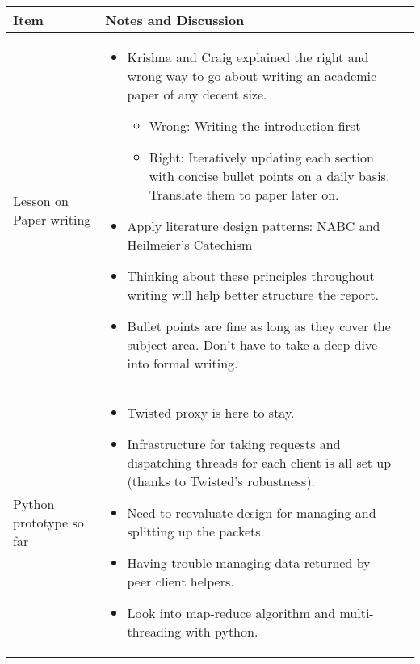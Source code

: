 \documentclass[a4wide,10pt]{extarticle}
\begin{document}
\vspace{0.5cm}
\begin{center}
\begin{tabular}{| m{3.0cm} | m{12.6cm} | m{2cm}|} \hline
\textbf{Item} & \textbf{Notes and Discussion}\\ \hline

Lesson on Paper writing & 
	\begin{itemize}
		\item Krishna and Craig explained the right and wrong way to go about writing an academic paper of any decent size.
		\begin{itemize}
			\item Wrong: Writing the introduction first
			\item Right: Iteratively updating each section with concise bullet points on a daily basis. Translate them to paper later on.
		\end{itemize}
		\item Apply literature design patterns: NABC and Heilmeier's Catechism
		\item Thinking about these principles throughout writing will help better structure the report.
		\item Bullet points are fine as long as they cover the subject area. Don't have to take a deep dive into formal writing.
	\end{itemize} 
\\ \hline
Python prototype so far &
	\begin{itemize}
		\item Twisted proxy is here to stay.
		\item Infrastructure for taking requests and dispatching threads for each client is all set up (thanks to Twisted's robustness).
		\item Need to reevaluate design for managing and splitting up the packets.
		\item Having trouble managing data returned by peer client helpers.
		\item Look into map-reduce algorithm and multi-threading with python.
	\end{itemize}
\\ \hline


\end{tabular}
\end{center}
\end{document}
